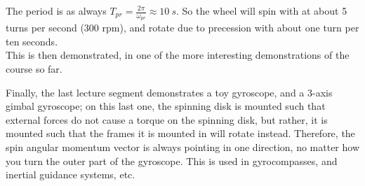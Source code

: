 \documentclass[8.01x]{subfiles}
\begin{document}
The period is as always $T_{pr} = \frac{2 \pi}{\omega_{pr}} \approx \SI{10}{s}$. So the wheel will spin with at about 5 turns per second (300 rpm), and rotate due to precession with about one turn per ten seconds.\\
This is then demonstrated, in one of the more interesting demonstrations of the course so far.

Finally, the last lecture segment demonstrates a toy gyroscope, and a 3-axis gimbal gyroscope; on this last one, the spinning disk is mounted such that external forces do not cause a torque on the spinning disk, but rather, it is mounted such that the frames it is mounted in will rotate instead. Therefore, the spin angular momentum vector is always pointing in one direction, no matter how you turn the outer part of the gyroscope. This is used in gyrocompasses, and inertial guidance systems, etc.
\end{document}
